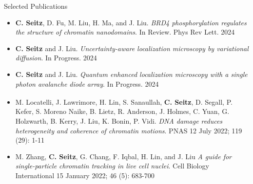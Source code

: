 \documentclass{beamer}					%
\begin{document}
\begin{frame}{Selected Publications}

\begin{itemize}

\item \textbf{C. Seitz}, D. Fu, M. Liu, H. Ma, and J. Liu. \textit{BRD4 phosphorylation regulates the structure of chromatin nanodomains}. In Review. Phys Rev Lett. 2024

\item \textbf{C. Seitz} and J. Liu. \textit{Uncertainty-aware localization microscopy by variational diffusion}. In Progress. 2024

\item \textbf{C. Seitz} and J. Liu. \textit{Quantum enhanced localization microscopy with a single photon avalanche diode array}. In Progress. 2024

\item M. Locatelli\textsuperscript{\textdagger}, J. Lawrimore\textsuperscript{\textdagger}, H. Lin\textsuperscript{\textdagger}, S. Sanaullah, \textbf{C. Seitz}, D. Segall, P. Kefer, S. Moreno Naike, B. Lietz, R. Anderson, J. Holmes, C. Yuan, G. Holzwarth, B. Kerry, J. Liu, K. Bonin, P. Vidi. \textit{DNA damage reduces heterogeneity and coherence of chromatin motions}. PNAS 12 July 2022; 119 (29): 1-11

\item M. Zhang, \textbf{C. Seitz}, G. Chang, F. Iqbal, H. Lin, and J. Liu \textit{A guide for single-particle chromatin tracking in live cell nuclei}. Cell Biology International 15 January 2022; 46 (5): 683-700


\end{itemize}
\end{frame}
\end{document}
